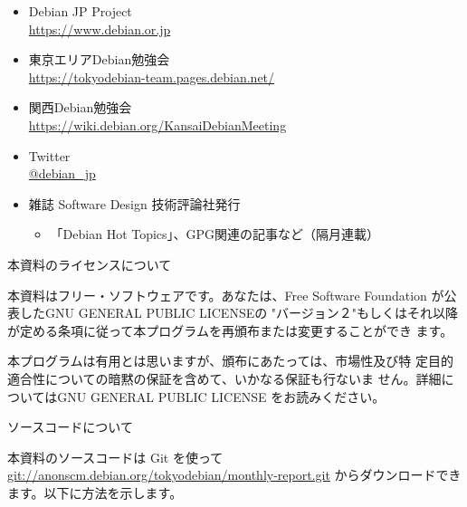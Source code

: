 \documentclass[mingoth,a4paper]{jsarticle}
\begin{document}
\begin{itemize}
  \item Debian JP Project \\
      \url{https://www.debian.or.jp}
  \item 東京エリアDebian勉強会\\
      \url{https://tokyodebian-team.pages.debian.net/}
  \item 関西Debian勉強会 \\
      \url{https://wiki.debian.org/KansaiDebianMeeting}
  \item Twitter \\
      \url{@debian_jp}
  \item  雑誌 Software Design 技術評論社発行
  \begin{itemize}
  \item 「Debian Hot Topics」、GPG関連の記事など（隔月連載）
  \end{itemize}
\end{itemize}

\newpage
\thispagestyle{empty}\mbox{}

\newpage

\begin{center}
本資料のライセンスについて
\end{center}

\begin{fontsize}{6}{6}

本資料はフリー・ソフトウェアです。あなたは、Free Software
Foundation が公表したGNU GENERAL PUBLIC LICENSEの "バージョン２"もしくはそれ以降
が定める条項に従って本プログラムを再頒布または変更することができ
ます。

本プログラムは有用とは思いますが、頒布にあたっては、市場性及び特
定目的適合性についての暗黙の保証を含めて、いかなる保証も行ないま
せん。詳細についてはGNU GENERAL PUBLIC LICENSE をお読みください。

\end{fontsize}

\begin{center}
ソースコードについて
\end{center}

本資料のソースコードは Git を使って\url{git://anonscm.debian.org/tokyodebian/monthly-report.git}
からダウンロードできます。以下に方法を示します。

\end{document}

